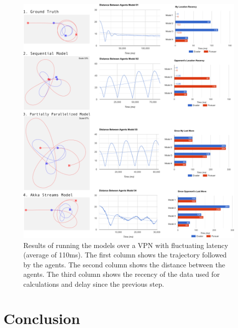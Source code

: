 \documentclass{article}
\begin{document}
\begin{figure}
	\centering
	\includegraphics[width=17.0cm]{charts-vpn}
	\caption{Results of running the models over a VPN with fluctuating latency (average of 110ms). The first column shows the trajectory followed by the agents. The second column shows the distance between the agents. The third column shows the recency of the data used for calculations and delay since the previous step.}\label{fig:charts-vpn}
\end{figure}


\section{Conclusion}

\afterpage{\clearpage}

\end{document}
